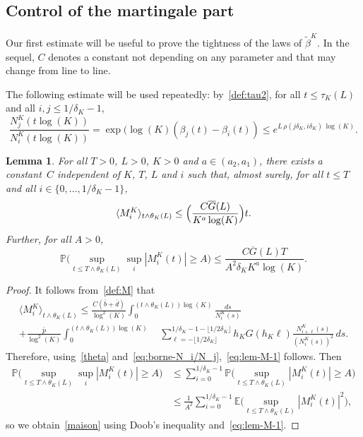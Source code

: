\documentclass[10pt]{amsart}
\theoremstyle{plain}
\newtheorem{lemma}[theorem]{Lemma}
\theoremstyle{remark}
\begin{document}
\subsection{Control of the martingale part}\label{sec:control-martingale}

Our first estimate will be useful to prove the tightness of the laws of $\widetilde{\beta}^K$. In the sequel, $C$ denotes a constant not depending on any parameter and that may change from line to line.

The following estimate will be used repeatedly: by~\eqref{def:tau2}, for all $t\leq\tau_K(L)$ and all $i,j\leq 1/\delta_K-1$,
\begin{equation}
\label{eq:borne-N_i/N_j}
\frac{N^K_j(t\log(K))}{N^K_{i}(t\log(K))} = \exp(\log(K) (\beta_{j}(t)-\beta_{i}(t)) \le e^{ L\, \rho(j \delta_K,i \delta_K)\, \log(K) }.
\end{equation}

\begin{lemma}
\label{lem:M}
For all $T>0$, $L>0$, $K>0$ and $a\in (a_2,a_1)$, there exists a constant~$C$ independent of $K$, $T$, $L$ and $i$ such that, almost surely, for all $t\leq T$ and all $i\in\{0,\ldots,1/\delta_K-1\}$,
\begin{equation}
\label{eq:lem-M-1}
\langle M^K_i\rangle_{t\wedge\theta_K(L)}\leq \Bigl(\frac{C\overline{G}(L)}{K^a\log(K)}\Bigr)t.
\end{equation}
Further, for all $A>0$,
\begin{equation}
\label{maison}
\mathbb{P}\Big(\sup_{t\le T\wedge \theta_{K}(L)}\sup_{i}|M^K_i(t)|\geq A\Big)\leq\frac{C\overline{G}(L)T}{A^2\delta_K K^a\log(K)}.
\end{equation}
\end{lemma}

\begin{proof}
It follows from~\eqref{def:M} that
\begin{multline*}
\langle M^K_i\rangle_{t\wedge\theta_K(L)} \leq \frac{C(\bar b+\bar d)}{\log^2 (K)}\int_0^{(t\wedge \theta_K(L))\log(K)}\frac{ds}{N^K_i(s)}\\
+\frac{\bar p}{\log^2 (K)}\int_0^{(t\wedge\theta_K(L))\log(K)}\quad
\sum_{\ell=-\lfloor 1/2\delta_K\rfloor}^{1/\delta_K-1-\lfloor 1/2\delta_K\rfloor}
h_{K} G(h_{K}\ell)\frac{N^K_{i+\ell}(s)}{(N^K_{i}(s))^2}\,ds.
\end{multline*}
Therefore, using~\eqref{theta} and~\eqref{eq:borne-N_i/N_j},~\eqref{eq:lem-M-1} follows. Then
\begin{align*}
\mathbb{P}\Big(\sup_{t\le T\wedge \theta_{K}(L)}\sup_{i}|M^K_i(t)|\geq A\Big) & \leq\sum_{i=0}^{1/\delta_K-1}\mathbb{P}\Big(\sup_{t\le T\wedge \theta_{K}(L)}|M^K_i(t)|\geq A\Big) \\ & \leq \frac{1}{A^2}\sum_{i=0}^{1/\delta_K-1}\mathbb{E}\Big(\sup_{t\le T\wedge \theta_{K}(L)}|M^K_i(t)|^2\Big),
\end{align*}
so we obtain~\eqref{maison} using Doob's inequality and~\eqref{eq:lem-M-1}.
\end{proof}
\end{document}

